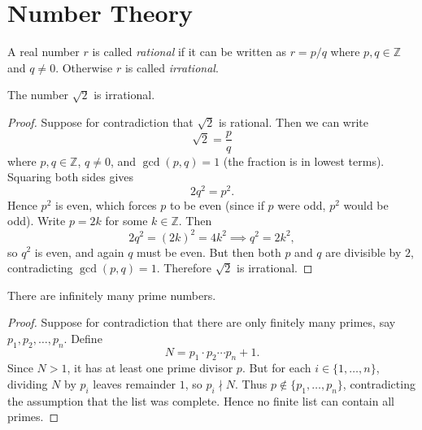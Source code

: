 \section{Number Theory}

\begin{Definition}
A real number $r$ is called \emph{rational} if it can be written as
$r = p/q$ where $p, q \in \mathbb{Z}$ and $q \neq 0$. Otherwise $r$ is
called \emph{irrational}.
\end{Definition}

\vspace{6pt}

\begin{Theorem}
The number $\sqrt{2}$ is irrational.
\end{Theorem}

\begin{proof}
Suppose for contradiction that $\sqrt{2}$ is rational. Then we can write
\[
  \sqrt{2} = \frac{p}{q}
\]
where $p, q \in \mathbb{Z}$, $q \neq 0$, and $\gcd(p, q) = 1$ (the
fraction is in lowest terms). Squaring both sides gives
\[
  2q^2 = p^2.
\]
Hence $p^2$ is even, which forces $p$ to be even (since if $p$ were odd,
$p^2$ would be odd). Write $p = 2k$ for some $k \in \mathbb{Z}$. Then
\[
  2q^2 = (2k)^2 = 4k^2 \implies q^2 = 2k^2,
\]
so $q^2$ is even, and again $q$ must be even. But then both $p$ and $q$
are divisible by $2$, contradicting $\gcd(p, q) = 1$.
Therefore $\sqrt{2}$ is irrational.
\end{proof}

\vspace{6pt}

\begin{Theorem}
There are infinitely many prime numbers.
\end{Theorem}

\begin{proof}
Suppose for contradiction that there are only finitely many primes,
say $p_1, p_2, \ldots, p_n$. Define
\[
  N = p_1 \cdot p_2 \cdots p_n + 1.
\]
Since $N > 1$, it has at least one prime divisor $p$. But for each
$i \in \{1, \ldots, n\}$, dividing $N$ by $p_i$ leaves remainder $1$,
so $p_i \nmid N$. Thus $p \notin \{p_1, \ldots, p_n\}$, contradicting
the assumption that the list was complete. Hence no finite list can
contain all primes.
\end{proof}

